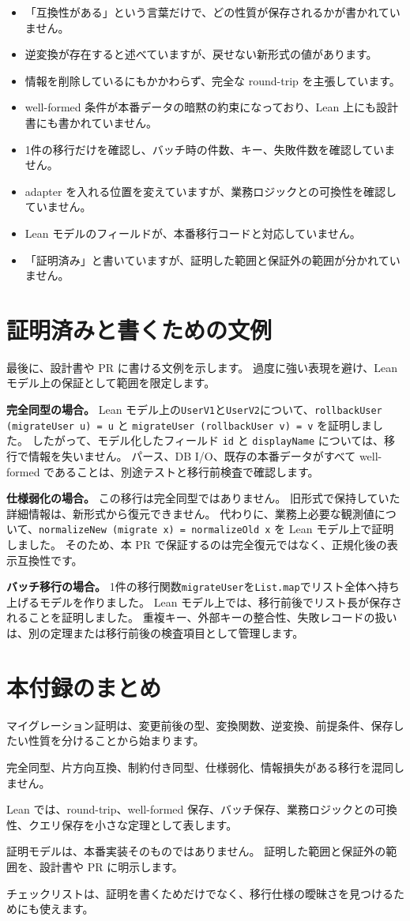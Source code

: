 \begin{itemize}
\item 「互換性がある」という言葉だけで、どの性質が保存されるかが書かれていません。
\item 逆変換が存在すると述べていますが、戻せない新形式の値があります。
\item 情報を削除しているにもかかわらず、完全な round-trip を主張しています。
\item well-formed 条件が本番データの暗黙の約束になっており、Lean 上にも設計書にも書かれていません。
\item 1件の移行だけを確認し、バッチ時の件数、キー、失敗件数を確認していません。
\item adapter を入れる位置を変えていますが、業務ロジックとの可換性を確認していません。
\item Lean モデルのフィールドが、本番移行コードと対応していません。
\item 「証明済み」と書いていますが、証明した範囲と保証外の範囲が分かれていません。
\end{itemize}

\section{証明済みと書くための文例}

最後に、設計書や PR に書ける文例を示します。
過度に強い表現を避け、Lean モデル上の保証として範囲を限定します。

\textbf{完全同型の場合。}
Lean モデル上の\texttt{UserV1}と\texttt{UserV2}について、\texttt{rollbackUser (migrateUser u) = u} と \texttt{migrateUser (rollbackUser v) = v} を証明しました。
したがって、モデル化したフィールド \texttt{id} と \texttt{displayName} については、移行で情報を失いません。
パース、DB I/O、既存の本番データがすべて well-formed であることは、別途テストと移行前検査で確認します。

\textbf{仕様弱化の場合。}
この移行は完全同型ではありません。
旧形式で保持していた詳細情報は、新形式から復元できません。
代わりに、業務上必要な観測値について、\texttt{normalizeNew (migrate x) = normalizeOld x} を Lean モデル上で証明しました。
そのため、本 PR で保証するのは完全復元ではなく、正規化後の表示互換性です。

\textbf{バッチ移行の場合。}
1件の移行関数\texttt{migrateUser}を\texttt{List.map}でリスト全体へ持ち上げるモデルを作りました。
Lean モデル上では、移行前後でリスト長が保存されることを証明しました。
重複キー、外部キーの整合性、失敗レコードの扱いは、別の定理または移行前後の検査項目として管理します。

\section{本付録のまとめ}

マイグレーション証明は、変更前後の型、変換関数、逆変換、前提条件、保存したい性質を分けることから始まります。

完全同型、片方向互換、制約付き同型、仕様弱化、情報損失がある移行を混同しません。

Lean では、round-trip、well-formed 保存、バッチ保存、業務ロジックとの可換性、クエリ保存を小さな定理として表します。

証明モデルは、本番実装そのものではありません。
証明した範囲と保証外の範囲を、設計書や PR に明示します。

チェックリストは、証明を書くためだけでなく、移行仕様の曖昧さを見つけるためにも使えます。
